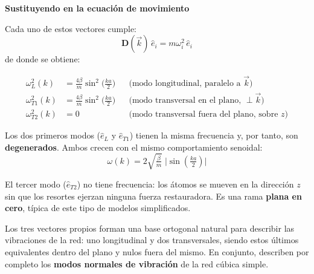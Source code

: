 \documentclass{article}
\begin{document}
\medskip
\textcolor{Tarawera}{\textbf{Sustituyendo en la ecuación de movimiento}}

Cada uno de estos vectores cumple:
\[
\mathbf D(\vec k)\,\hat e_i = m\omega_i^2\,\hat e_i
\]
de donde se obtiene:

\begin{equation}
\boxed{
\begin{aligned}
\omega_L^2(k)   &= \tfrac{4\beta}{m}\sin^2\!\Big(\tfrac{ka}{2}\Big)
&&\text{(modo longitudinal, paralelo a }\vec k\text{)}\\[4pt]
\omega_{T1}^2(k)&= \tfrac{4\beta}{m}\sin^2\!\Big(\tfrac{ka}{2}\Big)
&&\text{(modo transversal en el plano, }\perp\vec k\text{)}\\[4pt]
\omega_{T2}^2(k)&= 0
&&\text{(modo transversal fuera del plano, sobre }z\text{)}
\end{aligned}}
\label{eq:f_modos_frecuencias}
\end{equation}

\medskip

Los dos primeros modos (\(\hat e_L\) y \(\hat e_{T1}\)) tienen la misma frecuencia y, por tanto, son \textbf{degenerados}.  
  Ambos crecen con el mismo comportamiento senoidal:
  \[
  \omega(k) = 2\sqrt{\tfrac{\beta}{m}}\;\lvert\sin(\tfrac{ka}{2})\rvert
  \]
  
El tercer modo (\(\hat e_{T2}\)) no tiene frecuencia:  
  los átomos se mueven en la dirección \(z\) sin que los resortes ejerzan ninguna fuerza restauradora.  
  Es una rama \textbf{plana en cero}, típica de este tipo de modelos simplificados.

\medskip
Los tres vectores propios forman una base ortogonal natural para describir las vibraciones de la red:  
uno longitudinal y dos transversales, siendo estos últimos equivalentes dentro del plano y nulos fuera del mismo.  
En conjunto, describen por completo los \textbf{modos normales de vibración} de la red cúbica simple.
\end{document}
